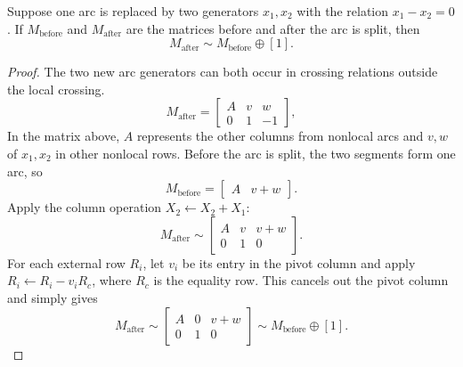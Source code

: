 \documentclass[10pt,a4paper]{amsart}
\begin{document}
\begin{lemma}
Suppose one arc is replaced by two generators $x_1,x_2$ with the relation $x_1-x_2=0$. If $M_{\mathrm{before}}$ and $M_{\mathrm{after}}$ are the matrices before and after the arc is split, then
\[
M_{\mathrm{after}}\sim M_{\mathrm{before}}\oplus[1].
\]
\end{lemma}

\begin{proof}
The two new arc generators can both occur in crossing relations outside the local crossing.
\[
M_{\mathrm{after}}=
\begin{bmatrix}
A&v&w\\
0&1&-1
\end{bmatrix},
\]
In the matrix above, $A$ represents the other columns from nonlocal arcs and $v,w$ of $x_1,x_2$ in other nonlocal rows. Before the arc is split, the two segments form one arc, so
\[
M_{\mathrm{before}}=
\begin{bmatrix}
A&v+w
\end{bmatrix}.
\]
Apply the column operation $X_2\leftarrow X_2+X_1$:
\[
M_{\mathrm{after}}\sim
\begin{bmatrix}
A&v&v+w\\
0&1&0
\end{bmatrix}.
\]
For each external row $R_i$, let $v_i$ be its entry in the pivot column and apply $R_i\leftarrow R_i-v_iR_c$, where $R_c$ is the equality row. This cancels out the pivot column and simply gives
\[
M_{\mathrm{after}}\sim
\begin{bmatrix}
A&0&v+w\\
0&1&0
\end{bmatrix}
\sim M_{\mathrm{before}}\oplus[1].
\]
\end{proof}
\end{document}
